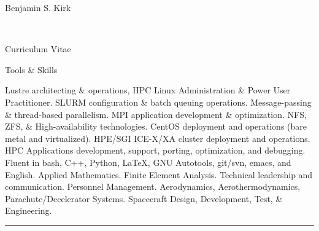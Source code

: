 \documentclass[10pt]{report}
\begin{document}
\begin{cv}{\centerline{\Large Benjamin S. Kirk}\\
    \centerline{\large Curriculum Vitae}}
  \begin{cvlist}{Tools \& Skills}
    \item[]
    Lustre architecting \& operations, HPC Linux Administration \& Power User Practitioner. SLURM configuration \& batch queuing operations. Message-passing \& thread-based parallelism. MPI application development \& optimization. NFS, ZFS, \& High-availability technologies. CentOS deployment and operations (bare metal and virtualized). HPE/SGI ICE-X/XA cluster deployment and operations. HPC Applications development, support, porting, optimization, and debugging. Fluent in bash, C++, Python, \LaTeX{}, GNU Autotools, git/svn, emacs, and English. Applied Mathematics. Finite Element Analysis. Technical leadership and communication. Personnel Management. Aerodynamics, Aerothermodynamics, Parachute/Decelerator Systems. Spacecraft Design, Development, Test, \& Engineering.
  \end{cvlist}



{\hfill \hrule\hfill\vspace{.1mm} \\}
\end{cv}
\end{document}
